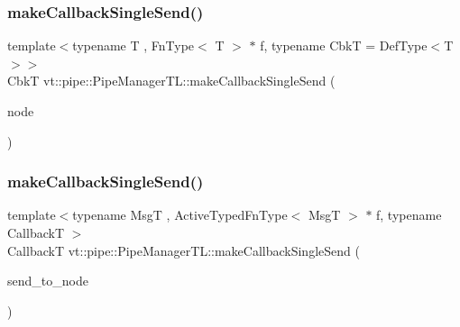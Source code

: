 \mbox{\label{structvt_1_1pipe_1_1_pipe_manager_t_l_a8776a3e14cce177c3b31aed347177750}} 
\subsubsection{\texorpdfstring{make\+Callback\+Single\+Send()}{makeCallbackSingleSend()}\hspace{0.1cm}{\footnotesize\ttfamily [1/2]}}
{\footnotesize\ttfamily template$<$typename T , Fn\+Type$<$ T $>$ $\ast$ f, typename CbkT  = Def\+Type$<$\+T$>$$>$ \\
CbkT vt\+::pipe\+::\+Pipe\+Manager\+T\+L\+::make\+Callback\+Single\+Send (\begin{DoxyParamCaption}\item[{\hyperlink{namespacevt_a866da9d0efc19c0a1ce79e9e492f47e2}{Node\+Type} const \&}]{node }\end{DoxyParamCaption})}

\mbox{\label{structvt_1_1pipe_1_1_pipe_manager_t_l_ab160500f39018d96e56743095a1869e8}} 
\subsubsection{\texorpdfstring{make\+Callback\+Single\+Send()}{makeCallbackSingleSend()}\hspace{0.1cm}{\footnotesize\ttfamily [2/2]}}
{\footnotesize\ttfamily template$<$typename MsgT , Active\+Typed\+Fn\+Type$<$ Msg\+T $>$ $\ast$ f, typename CallbackT $>$ \\
CallbackT vt\+::pipe\+::\+Pipe\+Manager\+T\+L\+::make\+Callback\+Single\+Send (\begin{DoxyParamCaption}\item[{\hyperlink{namespacevt_a866da9d0efc19c0a1ce79e9e492f47e2}{Node\+Type} const \&}]{send\+\_\+to\+\_\+node }\end{DoxyParamCaption})}

